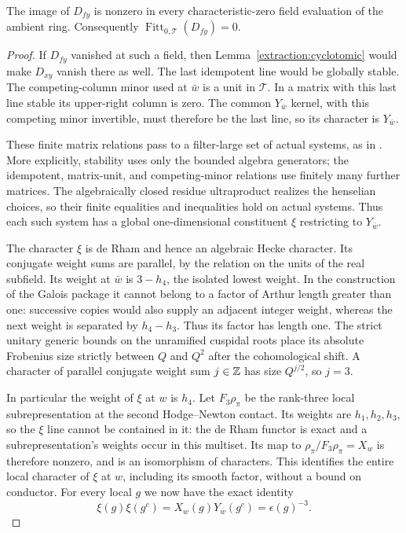 \begin{lemma}
\label{extraction:no-line}
The image of $D_{fy}$ is nonzero in every characteristic-zero
field evaluation of the ambient ring.  Consequently
$\operatorname{Fitt}_{0,\mathscr T}(D_{fy})=0$.
\end{lemma}

\begin{proof}
If $D_{fy}$ vanished at such a field, then
Lemma~\ref{extraction:cyclotomic} would make $D_{xy}$ vanish
there as well.  The last idempotent line would be globally
stable.  The competing-column minor used at $\bar w$ is
a unit in $\mathscr T$.  In a matrix with this last line
stable its upper-right column is zero.  The common
$Y_{\bar w}$ kernel, with this competing minor invertible,
must therefore be the last line, so its character is
$Y_{\bar w}$.

These finite matrix relations pass to a filter-large set of
actual systems, as in \cite[proof of Lemma~9.5]{C}.  More explicitly,
stability uses only the bounded algebra generators; the
idempotent, matrix-unit, and competing-minor relations use
finitely many further matrices.  The algebraically closed
residue ultraproduct realizes the henselian choices, so their
finite equalities and inequalities hold on actual systems.
Thus each such system has a global one-dimensional
constituent $\xi$ restricting to $Y_{\bar w}$.

The character $\xi$ is de Rham and hence an algebraic Hecke
character.  Its conjugate weight sums are parallel, by the
relation on the units of the real subfield.  Its weight at
$\bar w$ is $3-h_4$, the isolated lowest weight.  In the
construction of the Galois package it cannot belong to a
factor of Arthur length greater than one: successive
copies would also supply an adjacent integer weight,
whereas the next weight is separated by $h_4-h_3$.
Thus its factor has length one.  The strict unitary generic
bounds on the unramified cuspidal roots place its absolute
Frobenius size strictly between $Q$ and $Q^2$ after the
cohomological shift.  A character of parallel conjugate
weight sum $j\in\mathbb Z$ has size $Q^{j/2}$, so $j=3$.

In particular the weight of $\xi$ at $w$ is $h_4$.
Let $F_3\rho_\pi$ be the rank-three local subrepresentation
at the second Hodge--Newton contact.  Its weights are
$h_1,h_2,h_3$, so the $\xi$ line cannot be contained in it:
the de Rham functor is exact and a subrepresentation's
weights occur in this multiset.  Its map to
$\rho_\pi/F_3\rho_\pi=X_w$ is therefore nonzero, and is an
isomorphism of characters.  This identifies the entire
local character of $\xi$ at $w$, including its smooth
factor, without a bound on conductor.  For every local
$g$ we now have the exact identity
\[
 \xi(g)\xi(g^c)
    =X_w(g)Y_{\bar w}(g^c)=\epsilon(g)^{-3}.
\]


\end{proof}
